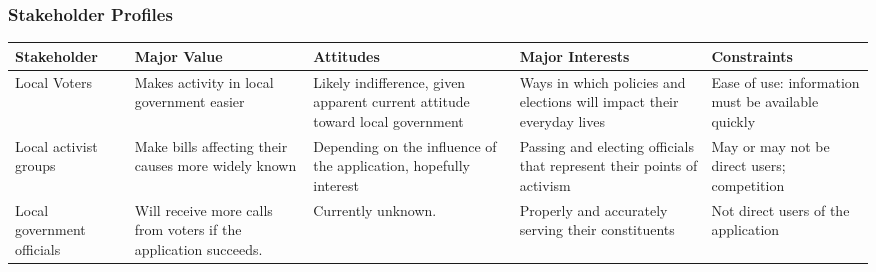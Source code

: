 \subsubsection{Stakeholder Profiles}
  \begin{longtabu}{X[L]X[L]X[L]X[L]X[L]}
    \toprule
    Stakeholder & Major Value & Attitudes & Major Interests & Constraints\\
    \midrule
    Local Voters&
    Makes activity in local government easier&
    Likely indifference, given apparent current attitude toward local government&
    Ways in which policies and elections will impact their everyday lives&
    Ease of use: information must be available quickly\\

    Local activist groups&
    Make bills affecting their causes more widely known&
    Depending on the influence of the application, hopefully interest&
    Passing and electing officials that represent their points of activism&
    May or may not be direct users; competition\\

    Local government officials&
    Will receive more calls from voters if the application succeeds.&
    Currently unknown.&
    Properly and accurately serving their constituents&
    Not direct users of the application\\
    \bottomrule
  \end{longtabu}
